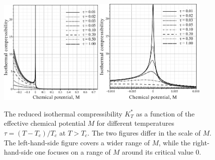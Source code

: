 \documentclass[12pt]{article}
\begin{document}
	\begin{figure}[h!]
		\centering \includegraphics[width=0.45\textwidth]{f2b.pdf}
		\includegraphics[width=0.475\textwidth]{f2c.pdf}
		\vskip-3mm\caption{The reduced isothermal compressibility $K^*_T$ as a function of the effective chemical potential $M$ for different temperatures $\tau = (T - T_c)/T_c$ at $T > T_c$. The two figures differ in the scale of $M$. The left-hand-side figure covers a wider range of $M$, while the right-hand-side one focuses on a range of $M$ around its critical value $0$.
		}\label{fig2b}
	\end{figure}
	
\end{document}
